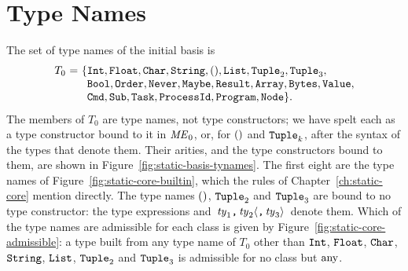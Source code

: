 \section{Type Names}\label{sec:appendix-static-basis-tynames}

The set of type names of the initial basis is
\[
\begin{array}{@{}r@{\ }c@{\ }l@{}}
  T_0 & = & \{\tInt, \tFloat, \tChar, \tString, \tunit, \tList, \tTuple{2},
            \tTuple{3},\\
      &   & \phantom{\{}\tBool, \sbtOrder, \sbtNever, \tMaybe, \sbtResult,
            \tArray, \tBytes, \tValue,\\
      &   & \phantom{\{}\sbtCmd, \sbtSub, \sbtTask, \sbtProcessId,
            \sbtProgram, \sbtNode\}.
\end{array}
\]
The members of $T_0$ are type names, not type constructors; we have spelt each
as a type constructor bound to it in $\mathit{ME}_0$, or, for $\mathtt{()}$ and
$\mathtt{Tuple}_{k}$, after the syntax of the types that denote them. Their arities,
and the type constructors bound to them, are shown in
Figure~\ref{fig:static-basis-tynames}. The first eight are the type names of
Figure~\ref{fig:static-core-builtin}, which the rules of
Chapter~\ref{ch:static-core} mention directly. The type names $\mathtt{()}$,
$\mathtt{Tuple}_{2}$ and $\mathtt{Tuple}_{3}$ are bound to no type constructor: the type
expressions \kw{()} and \kw{(}$\,\mathit{ty}_1\textnormal{\texttt{,}}\,\mathit{ty}_2\langle \textnormal{\texttt{,}}\,\mathit{ty}_3\rangle\,$\kw{)}
denote them. Which of the type names are admissible for each class is given by
Figure~\ref{fig:static-core-admissible}: a type built from any type name of
$T_0$ other than $\mathtt{Int}$, $\mathtt{Float}$, $\mathtt{Char}$, $\mathtt{String}$, $\mathtt{List}$,
$\mathtt{Tuple}_{2}$ and $\mathtt{Tuple}_{3}$ is admissible for no class but $\mathrm{any}$.

